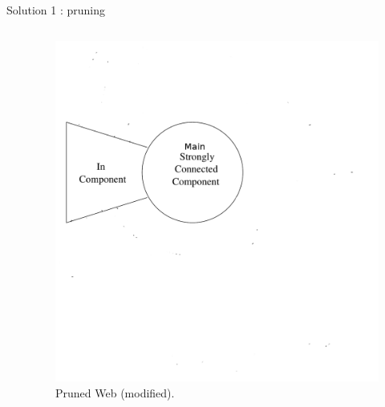 \documentclass[10pt]{beamer}
\begin{document}
\begin{frame}[allowframebreaks]{Solution 1 : pruning}
\begin{columns}
\begin{column}{0.5\textwidth}
    \end{column}
    \begin{column}{0.5\textwidth}
      \begin{figure}
        \includegraphics[trim=.5cm 0cm .2cm 0cm,clip,width=\linewidth]{web-graph-pruned.png}
        \caption{Pruned Web \cite[p.~187]{leskovec2014mining} (modified).}
        \label{fig:web-graph}
      \end{figure}
    \end{column}
  \end{columns}
\end{frame}
\end{document}
